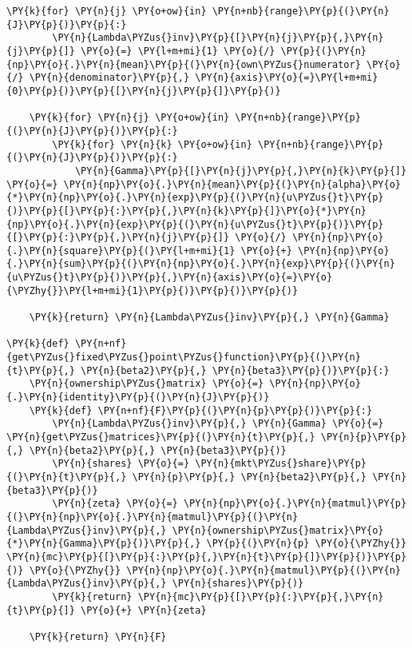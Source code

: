 \begin{tcolorbox}[breakable, size=fbox, boxrule=1pt, pad at break*=1mm,colback=cellbackground, colframe=cellborder]
\begin{Verbatim}[commandchars=\\\{\}]
    \PY{k}{for} \PY{n}{j} \PY{o+ow}{in} \PY{n+nb}{range}\PY{p}{(}\PY{n}{J}\PY{p}{)}\PY{p}{:}
        \PY{n}{Lambda\PYZus{}inv}\PY{p}{[}\PY{n}{j}\PY{p}{,}\PY{n}{j}\PY{p}{]} \PY{o}{=} \PY{l+m+mi}{1} \PY{o}{/} \PY{p}{(}\PY{n}{np}\PY{o}{.}\PY{n}{mean}\PY{p}{(}\PY{n}{own\PYZus{}numerator} \PY{o}{/} \PY{n}{denominator}\PY{p}{,} \PY{n}{axis}\PY{o}{=}\PY{l+m+mi}{0}\PY{p}{)}\PY{p}{[}\PY{n}{j}\PY{p}{]}\PY{p}{)}

    \PY{k}{for} \PY{n}{j} \PY{o+ow}{in} \PY{n+nb}{range}\PY{p}{(}\PY{n}{J}\PY{p}{)}\PY{p}{:}
        \PY{k}{for} \PY{n}{k} \PY{o+ow}{in} \PY{n+nb}{range}\PY{p}{(}\PY{n}{J}\PY{p}{)}\PY{p}{:}
            \PY{n}{Gamma}\PY{p}{[}\PY{n}{j}\PY{p}{,}\PY{n}{k}\PY{p}{]} \PY{o}{=} \PY{n}{np}\PY{o}{.}\PY{n}{mean}\PY{p}{(}\PY{n}{alpha}\PY{o}{*}\PY{n}{np}\PY{o}{.}\PY{n}{exp}\PY{p}{(}\PY{n}{u\PYZus{}t}\PY{p}{)}\PY{p}{[}\PY{p}{:}\PY{p}{,}\PY{n}{k}\PY{p}{]}\PY{o}{*}\PY{n}{np}\PY{o}{.}\PY{n}{exp}\PY{p}{(}\PY{n}{u\PYZus{}t}\PY{p}{)}\PY{p}{[}\PY{p}{:}\PY{p}{,}\PY{n}{j}\PY{p}{]} \PY{o}{/} \PY{n}{np}\PY{o}{.}\PY{n}{square}\PY{p}{(}\PY{l+m+mi}{1} \PY{o}{+} \PY{n}{np}\PY{o}{.}\PY{n}{sum}\PY{p}{(}\PY{n}{np}\PY{o}{.}\PY{n}{exp}\PY{p}{(}\PY{n}{u\PYZus{}t}\PY{p}{)}\PY{p}{,}\PY{n}{axis}\PY{o}{=}\PY{o}{\PYZhy{}}\PY{l+m+mi}{1}\PY{p}{)}\PY{p}{)}\PY{p}{)}

    \PY{k}{return} \PY{n}{Lambda\PYZus{}inv}\PY{p}{,} \PY{n}{Gamma}

\PY{k}{def} \PY{n+nf}{get\PYZus{}fixed\PYZus{}point\PYZus{}function}\PY{p}{(}\PY{n}{t}\PY{p}{,} \PY{n}{beta2}\PY{p}{,} \PY{n}{beta3}\PY{p}{)}\PY{p}{:}
    \PY{n}{ownership\PYZus{}matrix} \PY{o}{=} \PY{n}{np}\PY{o}{.}\PY{n}{identity}\PY{p}{(}\PY{n}{J}\PY{p}{)}
    \PY{k}{def} \PY{n+nf}{F}\PY{p}{(}\PY{n}{p}\PY{p}{)}\PY{p}{:}
        \PY{n}{Lambda\PYZus{}inv}\PY{p}{,} \PY{n}{Gamma} \PY{o}{=} \PY{n}{get\PYZus{}matrices}\PY{p}{(}\PY{n}{t}\PY{p}{,} \PY{n}{p}\PY{p}{,} \PY{n}{beta2}\PY{p}{,} \PY{n}{beta3}\PY{p}{)}
        \PY{n}{shares} \PY{o}{=} \PY{n}{mkt\PYZus{}share}\PY{p}{(}\PY{n}{t}\PY{p}{,} \PY{n}{p}\PY{p}{,} \PY{n}{beta2}\PY{p}{,} \PY{n}{beta3}\PY{p}{)}
        \PY{n}{zeta} \PY{o}{=} \PY{n}{np}\PY{o}{.}\PY{n}{matmul}\PY{p}{(}\PY{n}{np}\PY{o}{.}\PY{n}{matmul}\PY{p}{(}\PY{n}{Lambda\PYZus{}inv}\PY{p}{,} \PY{n}{ownership\PYZus{}matrix}\PY{o}{*}\PY{n}{Gamma}\PY{p}{)}\PY{p}{,} \PY{p}{(}\PY{n}{p} \PY{o}{\PYZhy{}} \PY{n}{mc}\PY{p}{[}\PY{p}{:}\PY{p}{,}\PY{n}{t}\PY{p}{]}\PY{p}{)}\PY{p}{)} \PY{o}{\PYZhy{}} \PY{n}{np}\PY{o}{.}\PY{n}{matmul}\PY{p}{(}\PY{n}{Lambda\PYZus{}inv}\PY{p}{,} \PY{n}{shares}\PY{p}{)}
        \PY{k}{return} \PY{n}{mc}\PY{p}{[}\PY{p}{:}\PY{p}{,}\PY{n}{t}\PY{p}{]} \PY{o}{+} \PY{n}{zeta}

    \PY{k}{return} \PY{n}{F}
\end{Verbatim}
\end{tcolorbox}

